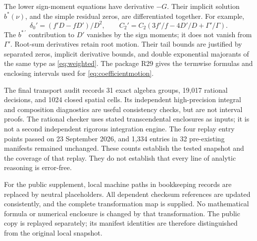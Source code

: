 The lower sign-moment equations have derivative \(-G\).
Their implicit solution \(b^*(\nu)\), and the simple residual zeros,
are differentiated together. For example,
\[
 \delta_0'=(f'D-fD')/D^2,\qquad
 C_2'=C_2(3f'/f-4D'/D+\Gamma'/\Gamma).
\]
The \(b^{*\,\prime}\) contribution to \(D'\) vanishes by the sign
moments; it does not vanish from \(\Gamma'\).
Root-sum derivatives retain root motion. Their tail bounds are justified
by separated zeros, implicit derivative bounds, and double exponential
majorants of the same type as \eqref{eq:weighted}.
The package R29 gives the termwise formulas and enclosing intervals
used for \eqref{eq:coefficientmotion}.

The final transport audit records 31 exact algebra groups,
19,017 rational decisions, and 1024 closed spatial cells. Its independent
high-precision integral and composition diagnostics are useful consistency
checks, but are not interval proofs.
The rational checker uses stated transcendental enclosures as inputs;
it is not a second independent rigorous integration engine.
The four replay entry points passed on 23 September 2026, and
1,334 entries in 32 pre-existing manifests remained unchanged.
These counts establish the tested snapshot and the coverage of that
replay. They do not establish that every line of analytic reasoning
is error-free.

For the public supplement, local machine paths in bookkeeping records are
replaced by neutral placeholders. All dependent checksum references are
updated consistently, and the complete transformation map is supplied.
No mathematical formula or numerical enclosure is changed by that
transformation. The public copy is replayed separately; its manifest
identities are therefore distinguished from the original local snapshot.

